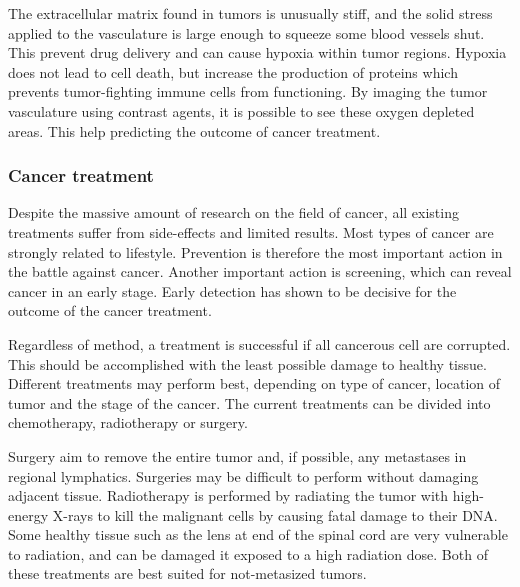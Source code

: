 The extracellular matrix found in tumors is unusually stiff, and the solid stress applied to the vasculature is large enough to  squeeze some blood vessels shut. This prevent drug delivery and can cause hypoxia within tumor regions. Hypoxia does not lead to cell death, but increase the production of proteins which prevents tumor-fighting immune cells from functioning\cite{Jain2014}. By imaging the tumor vasculature using contrast agents, it is possible to see these oxygen depleted areas. This help predicting the outcome of cancer treatment. 


\subsubsection{Cancer treatment}
Despite the massive amount of research on the field of cancer, all existing treatments suffer from side-effects and limited results. Most types of cancer are strongly related to lifestyle. Prevention is therefore the most important action in the battle against cancer. Another important action is screening, which can reveal cancer in an early stage. Early detection has shown to be decisive for the outcome of the cancer treatment\cite{king2006cancer}\cite{Jordan1986}.

Regardless of method, a treatment is successful if all cancerous cell are corrupted. This should be accomplished with the least possible damage to healthy tissue. Different treatments may perform best, depending on type of cancer, location of tumor and the stage of the cancer. The current treatments can be divided into chemotherapy, radiotherapy or surgery.  

Surgery aim to remove the entire tumor and, if possible, any metastases in regional lymphatics. Surgeries may be difficult to perform without damaging adjacent tissue. Radiotherapy is performed by radiating the tumor with high-energy X-rays to kill the malignant cells by causing fatal damage to their DNA. Some healthy tissue such as the lens at end of the spinal cord are very vulnerable to radiation, and can be damaged it exposed to a high radiation dose. Both of these treatments are best suited for not-metasized tumors. 

